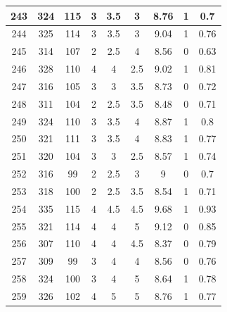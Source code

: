 \documentclass[11pt]{article}
\begin{document}
\begin{appendix}
\begin{longtable}[H]{|c|c|c|c|c|c|c|c|c|}
	243        & 324       & 115         & 3                 & 3.5 & 3   & 8.76 & 1        & 0.7             \\ \hline
	244        & 325       & 114         & 3                 & 3.5 & 3   & 9.04 & 1        & 0.76            \\ \hline
	245        & 314       & 107         & 2                 & 2.5 & 4   & 8.56 & 0        & 0.63            \\ \hline
	246        & 328       & 110         & 4                 & 4   & 2.5 & 9.02 & 1        & 0.81            \\ \hline
	247        & 316       & 105         & 3                 & 3   & 3.5 & 8.73 & 0        & 0.72            \\ \hline
	248        & 311       & 104         & 2                 & 2.5 & 3.5 & 8.48 & 0        & 0.71            \\ \hline
	249        & 324       & 110         & 3                 & 3.5 & 4   & 8.87 & 1        & 0.8             \\ \hline
	250        & 321       & 111         & 3                 & 3.5 & 4   & 8.83 & 1        & 0.77            \\ \hline
	251        & 320       & 104         & 3                 & 3   & 2.5 & 8.57 & 1        & 0.74            \\ \hline
	252        & 316       & 99          & 2                 & 2.5 & 3   & 9    & 0        & 0.7             \\ \hline
	253        & 318       & 100         & 2                 & 2.5 & 3.5 & 8.54 & 1        & 0.71            \\ \hline
	254        & 335       & 115         & 4                 & 4.5 & 4.5 & 9.68 & 1        & 0.93            \\ \hline
	255        & 321       & 114         & 4                 & 4   & 5   & 9.12 & 0        & 0.85            \\ \hline
	256        & 307       & 110         & 4                 & 4   & 4.5 & 8.37 & 0        & 0.79            \\ \hline
	257        & 309       & 99          & 3                 & 4   & 4   & 8.56 & 0        & 0.76            \\ \hline
	258        & 324       & 100         & 3                 & 4   & 5   & 8.64 & 1        & 0.78            \\ \hline
	259        & 326       & 102         & 4                 & 5   & 5   & 8.76 & 1        & 0.77            \\ \hline

\end{longtable}
\end{appendix}
\end{document}
